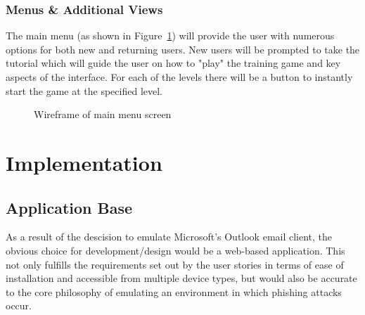 \documentclass{l4proj}
\begin{document}
\subsection{Menus \& Additional Views}
The main menu (as shown in Figure~\ref{fig:menu_wf}) will provide the user with numerous options for both new and returning users. New users will be prompted to take the tutorial which will guide the user on how to "play" the training game and key aspects of the interface. For each of the levels there will be a button to instantly start the game at the specified level.

\begin{figure}[H]
    \centering
    \caption{Wireframe of main menu screen}
    \label{fig:menu_wf} 
\end{figure}

\chapter{Implementation}

\section{Application Base}
As a result of the descision to emulate Microsoft's Outlook email client, the obvious choice for development/design would be a web-based application. This not only fulfills the requirements set out by the user stories in terms of ease of installation and accessible from multiple device types, but would also be accurate to the core philosophy of emulating an environment in which phishing attacks occur.
\end{document}
